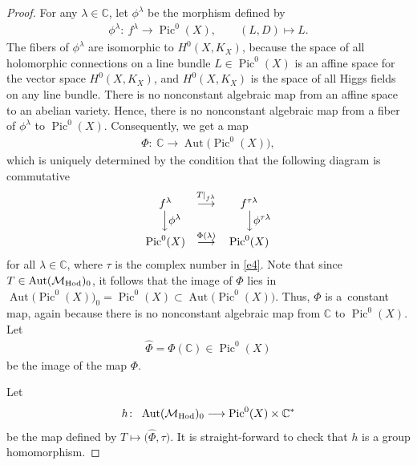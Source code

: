 \documentclass[pdftex]{sigma}
\numberwithin{equation}{section}
\begin{document}
\begin{proof}
For any $\lambda \in \mathbb C$, let $\phi^\lambda$ be the morphism def\/ined by
\begin{gather}\label{e7}
\phi^\lambda \colon \ f^\lambda \longrightarrow \operatorname{Pic}^0(X) ,\qquad (L, D) \longmapsto L .
\end{gather}
The f\/ibers of $\phi^\lambda$ are isomorphic to $H^0(X, K_X)$, because the space of all holomorphic connections on a line bundle $L \in \operatorname{Pic}^0(X)$ is an af\/f\/ine space for the vector space $H^0(X, K_X)$, and $H^0(X, K_X)$ is the space of all Higgs f\/ields on any line bundle. There is no nonconstant algebraic map from an af\/f\/ine space to an abelian variety. Hence, there is no nonconstant algebraic map from a f\/iber of $\phi^\lambda$ to $\operatorname{Pic}^0(X)$. Consequently, we get a map
\begin{gather*}
\Phi \colon \  {\mathbb C} \longrightarrow \operatorname{Aut}\big(\operatorname{Pic}^0(X)\big),
\end{gather*}
which is uniquely determined by the condition that the following diagram is commutative
\begin{gather*}
\begin{matrix}
f^\lambda & \stackrel{T\vert_{f^\lambda}}{\longrightarrow} & f^{\tau\lambda}\\
~ ~~ \Big\downarrow \phi^\lambda && ~ ~~~~ \Big\downarrow \phi^{\tau\lambda}\\
\operatorname{Pic}^0(X) & \stackrel{\Phi(\lambda)}{\longrightarrow} &\operatorname{Pic}^0(X)
\end{matrix}
\end{gather*}
for all $\lambda \in \mathbb C$, where $\tau$ is the complex number in \eqref{e4}$ $. Note that since $T \in \operatorname{Aut}({\mathcal M}_{\rm Hod})_0$, it follows that the image of $\Phi$ lies in $\operatorname{Aut}\big(\operatorname{Pic}^0(X)\big)_0 = \operatorname{Pic}^0(X) \subset \operatorname{Aut}\big(\operatorname{Pic}^0(X)\big)$. Thus, $\Phi$ is a~constant map, again because there is no nonconstant algebraic map from $\mathbb C$ to $\operatorname{Pic}^0(X)$. Let{\samepage
\begin{gather}\label{e5}
\widehat{\Phi} = \Phi({\mathbb C}) \in \operatorname{Pic}^0(X)
\end{gather}
be the image of the map $\Phi$.}

Let
\begin{gather*}
h \colon \ \operatorname{Aut}({\mathcal M}_{\rm Hod})_0 \longrightarrow \operatorname{Pic}^0(X)\times {\mathbb C}^*
\end{gather*}
be the map def\/ined by $T \longmapsto \big(\widehat{\Phi}, \tau\big)$. It is straight-forward to check that $h$ is a group homomorphism.


\end{proof}
\end{document}
